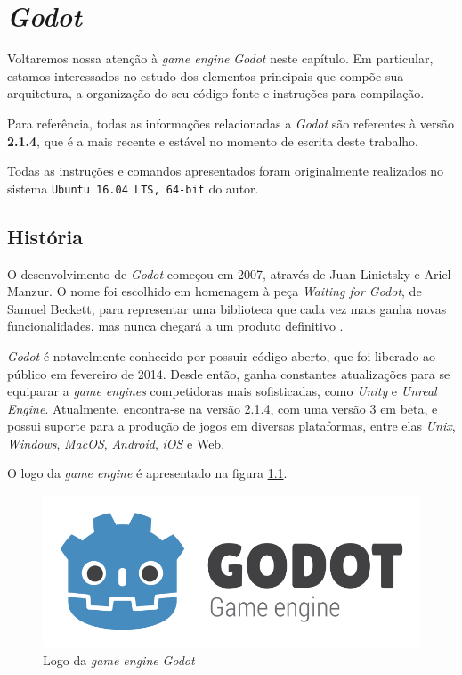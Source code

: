 \chapter{\textit{Godot}}
\label{cap:godot}

Voltaremos nossa atenção à \textit{game engine} \textit{Godot} \citep{godot} neste capítulo. Em particular, estamos interessados no estudo dos elementos principais que compõe sua arquitetura, a organização do seu código fonte e instruções para compilação.

Para referência, todas as informações relacionadas a \textit{Godot} são referentes à versão \textbf{2.1.4}, que é a mais recente e estável no momento de escrita deste trabalho.

Todas as instruções e comandos apresentados foram originalmente realizados no sistema \texttt{Ubuntu 16.04 LTS, 64-bit} do autor.


\section{História}

O desenvolvimento de \textit{Godot} começou em 2007, através de Juan Linietsky e Ariel Manzur. O nome foi escolhido em homenagem à peça \emph{Waiting for Godot}, de Samuel Beckett, para representar uma biblioteca que cada vez mais ganha novas funcionalidades, mas nunca chegará a um produto definitivo \citep{godotHistory}.

\textit{Godot} é notavelmente conhecido por possuir código aberto, que foi liberado ao público em fevereiro de 2014. Desde então, ganha constantes atualizações para se equiparar a \textit{game engines} competidoras mais sofisticadas, como \textit{Unity} e \textit{Unreal Engine}. Atualmente, encontra-se na versão 2.1.4, com uma versão 3 em beta, e possui suporte para a produção de jogos em diversas plataformas, entre elas \textit{Unix}, \textit{Windows}, \textit{MacOS}, \textit{Android}, \textit{iOS} e Web.

O logo da \textit{game engine} é apresentado na figura \ref{godotLogo}.

\begin{figure}[H]
  \centering
  \includegraphics[width=.5\textwidth]{image/godot-logo.png}
  \caption{Logo da \textit{game engine} \textit{Godot} \citep{godotHistory}}
  \label{godotLogo}
\end{figure}

